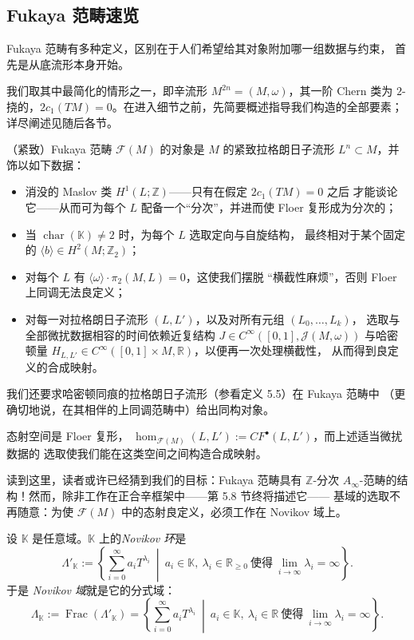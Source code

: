 \subsection{Fukaya 范畴速览}\label{sec:5.2}

Fukaya 范畴有多种定义，区别在于人们希望给其对象附加哪一组数据与约束，
首先是从底流形本身开始。

我们取其中最简化的情形之一，即辛流形 $M^{2n}=(M,\omega)$，其一阶 Chern 类为
$2$-挠的，$2c_1(TM)=0$。在进入细节之前，先简要概述指导我们构造的全部要素；
详尽阐述见随后各节。

（紧致）Fukaya 范畴 $\mathcal F(M)$ 的对象是 $M$ 的紧致拉格朗日子流形
$L^n\subset M$，并饰以如下数据：
\begin{itemize}
  \item 消没的 Maslov 类 $H^1(L;\mathbb Z)$——只有在假定 $2c_1(TM)=0$ 之后
  才能谈论它——从而可为每个 $L$ 配备一个“分次”，并进而使 Floer 复形成为分次的；
  \item 当 $\operatorname{char}(\mathbb K)\neq2$ 时，为每个 $L$ 选取定向与自旋结构，
  最终相对于某个固定的 $\langle b\rangle\in H^2(M;\mathbb Z_2)$；
  \item 对每个 $L$ 有 $\langle\omega\rangle\cdot\pi_2(M,L)=0$，这使我们摆脱
  “横截性麻烦”，否则 Floer 上同调无法良定义；
  \item 对每一对拉格朗日子流形 $(L,L')$，以及对所有元组 $(L_0,\dots,L_k)$，
  选取与全部微扰数据相容的时间依赖近复结构
  $J\in C^\infty([0,1],\mathcal J(M,\omega))$ 与哈密顿量
  $H_{L,L'}\in C^\infty([0,1]\times M,\mathbb R)$，以便再一次处理横截性，
  从而得到良定义的合成映射。
\end{itemize}
我们还要求哈密顿同痕的拉格朗日子流形（参看定义 5.5）在 Fukaya 范畴中
（更确切地说，在其相伴的上同调范畴中）给出同构对象。

态射空间是 Floer 复形，
$\operatorname{hom}_{\mathcal F(M)}(L,L'):=CF^\bullet(L,L')$，而上述适当微扰数据的
选取使我们能在这类空间之间构造合成映射。

读到这里，读者或许已经猜到我们的目标：Fukaya 范畴具有 $\mathbb Z$-分次
$A_\infty$-范畴的结构！然而，除非工作在正合辛框架中——第 5.8 节终将描述它——
基域的选取不再随意：为使 $\mathcal F(M)$ 中的态射良定义，必须工作在 Novikov 域上。


\begin{Def}\label{def:5.9}
设 $\mathbb K$ 是任意域。$\mathbb K$ 上的\emph{Novikov 环}是
\[
\Lambda'_{\mathbb K}:=\left\{\sum_{i=0}^\infty a_iT^{\lambda_i}\ \middle|\
a_i\in\mathbb K,\ \lambda_i\in\mathbb R_{\ge0}\ \text{使得}\
\lim_{i\to\infty}\lambda_i=\infty\right\}.
\]
于是 \emph{Novikov 域}就是它的分式域：
\begin{equation}
\Lambda_{\mathbb K}:=\operatorname{Frac}(\Lambda'_{\mathbb K})
=\left\{\sum_{i=0}^\infty a_iT^{\lambda_i}\ \middle|\
a_i\in\mathbb K,\ \lambda_i\in\mathbb R\ \text{使得}\
\lim_{i\to\infty}\lambda_i=\infty\right\}.
\label{eq:5.55}
\end{equation}
\end{Def}

